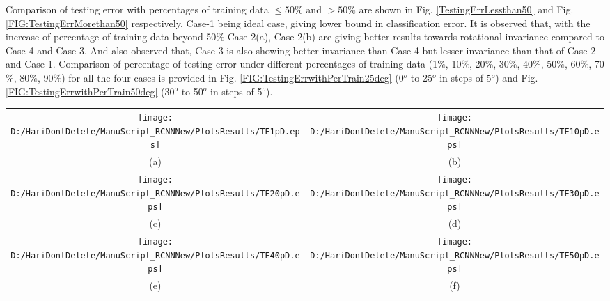  Comparison of testing error with percentages of training data $\leq 50\%$ and $> 50\%$ are shown in Fig. \ref{TestingErrLessthan50} and Fig. \ref{FIG:TestingErrMorethan50} respectively. Case-1 being ideal case, giving lower bound in classification error. It is observed that, with the increase of percentage of training data beyond 50$\%$ Case-2(a), Case-2(b) are giving better results towards rotational invariance compared to Case-4 and Case-3. And also observed that, Case-3 is also showing better invariance than Case-4 but lesser invariance than that of Case-2 and Case-1. Comparison of percentage of testing error under different percentages of training data (1$\%$, 10$\%$, 20$\%$, 30$\%$, 40$\%$, 50$\%$, 60$\%$, 70$\%$, 80$\%$, 90$\%$) for all the four cases is provided in Fig. \ref{FIG:TestingErrwithPerTrain25deg} (0$^o$ to 25$^o$ in steps of 5$^o$) and Fig. \ref{FIG:TestingErrwithPerTrain50deg} (30$^o$ to 50$^o$ in steps of 5$^o$).\\
 \begin{figure*}
\begin{tabular}{cc}
\texttt{[image: D:/HariDontDelete/ManuScript\_RCNNNew/PlotsResults/TE1pD.eps]}&\texttt{[image: D:/HariDontDelete/ManuScript\_RCNNNew/PlotsResults/TE10pD.eps]}\\
(a)  & (b) \\
\texttt{[image: D:/HariDontDelete/ManuScript\_RCNNNew/PlotsResults/TE20pD.eps]}&\texttt{[image: D:/HariDontDelete/ManuScript\_RCNNNew/PlotsResults/TE30pD.eps]}\\
(c)  & (d) \\
\texttt{[image: D:/HariDontDelete/ManuScript\_RCNNNew/PlotsResults/TE40pD.eps]}&\texttt{[image: D:/HariDontDelete/ManuScript\_RCNNNew/PlotsResults/TE50pD.eps]}\\
(e)  & (f) \\
\end{tabular}
\caption{ Comparisons of testing error for different cases under different percentages of training data (not greater than 50$\%$); (a) Percentage of training data:1, (b) Percentage of training data:10, (c) Percentage of training data:20, (d) Percentage of training data:30, (e) Percentage of training data:40, (f) Percentage of training data:50}
\label{TestingErrLessthan50}

\end{figure*}
 
